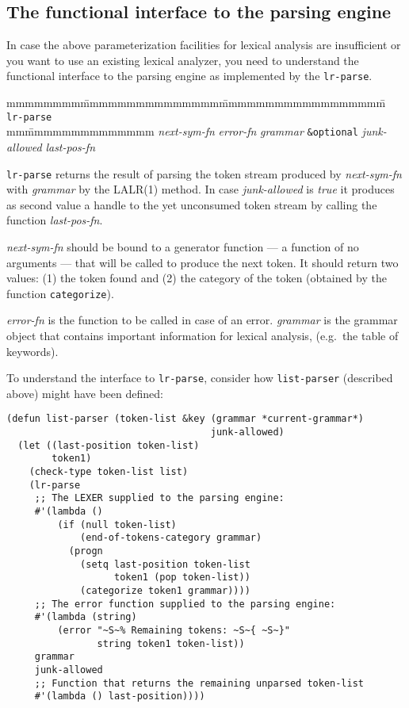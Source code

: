 \subsection{The functional interface to the parsing engine}

In case the above parameterization facilities for lexical analysis are
insufficient or you want to use an existing lexical analyzer, you need
to understand the functional interface to the parsing engine as
implemented by the {\tt lr-parse}.

\begin{tabbing}
mmmmmmmm\=mmmmmmmmmmmmmmm\=mmmmmmmmmmmmmmmmmm\=\kill 
{\tt lr-parse} \>\> \\ 
mm\=mmmmmmmmmmmmmm\kill
 \> {\em next-sym-fn} {\em error-fn} {\em grammar} {\tt \&optional} 
{\em junk-allowed} {\em last-pos-fn}
\end{tabbing}

{\tt lr-parse} returns the result of parsing the token stream produced
by {\em next-sym-fn} with {\em grammar} by the LALR(1) method.  In case
{\em junk-allowed}\/ is {\em true}\/ it produces as second value a handle
to the yet unconsumed token stream by calling the function {\em
last-pos-fn}.

{\em next-sym-fn} should be bound to a generator function --- a
function of no arguments --- that will be called to produce the next
token.  It should return two values: (1) the token found and (2) the
category of the token (obtained by the function {\tt categorize}). 

{\em error-fn} is the function to be called in case of an error.  {\em
grammar} is the grammar object that contains important information for
lexical analysis, (e.g.\ the table of keywords).  

To understand the interface to {\tt lr-parse}, consider how
{\tt list-parser} (described above) might have been defined:

{\tt \samepage \begin{verbatim}
(defun list-parser (token-list &key (grammar *current-grammar*)
                                    junk-allowed)
  (let ((last-position token-list)
        token1)
    (check-type token-list list)
    (lr-parse
     ;; The LEXER supplied to the parsing engine:
     #'(lambda ()
         (if (null token-list)
             (end-of-tokens-category grammar)
           (progn
             (setq last-position token-list
                   token1 (pop token-list))
             (categorize token1 grammar))))
     ;; The error function supplied to the parsing engine:
     #'(lambda (string)
         (error "~S~% Remaining tokens: ~S~{ ~S~}"
                string token1 token-list))
     grammar
     junk-allowed
     ;; Function that returns the remaining unparsed token-list
     #'(lambda () last-position))))
     \end{verbatim}
}

